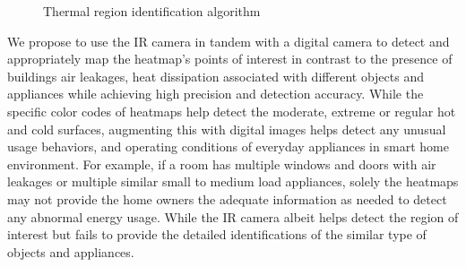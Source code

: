 \begin{figure}[!hp]
	\begin{minipage}{0.00\textwidth}
		\mbox{}
	\end{minipage}
	\begin{minipage}{0.48\textwidth}
		\begin{center}
			\scriptsize{
				}
							\caption{Thermal region identification algorithm}
							\label{algo:Two Object}
						\end{center}
					\end{minipage}
\end{figure}

We propose to use the IR camera in tandem with a digital camera to detect and appropriately map the heatmap's points of interest in contrast to the presence of buildings air leakages, heat dissipation associated with different objects and appliances while achieving high precision and detection accuracy. While the specific color codes of heatmaps help detect the moderate, extreme or regular hot and cold surfaces, augmenting this with digital images helps detect any unusual usage behaviors, and operating conditions of everyday appliances in smart home environment. For example, if a room has multiple windows and doors with air leakages or multiple similar small to medium load appliances, solely the heatmaps may not provide the home owners the adequate information as needed to detect any abnormal energy usage. While the IR camera albeit helps detect the region of interest but fails to provide the detailed identifications of the similar type of objects and appliances.

